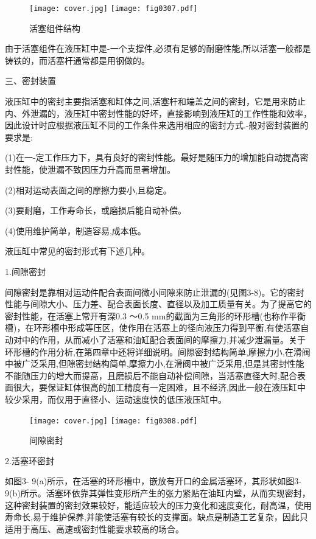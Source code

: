 \begin{figure}
\centering
\ifOpenSource
\texttt{[image: cover.jpg]}
\else
\texttt{[image: fig0307.pdf]}
\fi
\caption{活塞组件结构}
\label{fig:fig0307}
\end{figure}

\indent 由于活塞组件在液压缸中是-一个支撑件,必须有足够的耐磨性能,所以活塞一般都是铸铁的，而活塞杆通常都是用钢做的。

\indent 三、密封装置

\indent 液压缸中的密封主要指活塞和缸体之间,活塞杆和端盖之间的密封，它是用来防止内、外泄漏的，液压缸中密封性能的好坏，直接影响到液压缸的工作性能和效率，因此设计时应根据液压缸不同的工作条件来选用相应的密封方式.-般对密封装置的要求是:

\indent (1)在一-定工作压力下，具有良好的密封性能。最好是随压力的增加能自动提高密封性能，使泄漏不致因压力升高而显著增加。

\indent (2)相对运动表面之间的摩擦力要小,且稳定。

\indent (3)要耐磨，工作寿命长，或磨损后能自动补偿。

\indent (4)使用维护简单，制造容易,成本低。

\indent 液压缸中常见的密封形式有下述几种。

\indent 1.间隙密封

\indent 间隙密封是靠相对运动件配合表面间微小间隙来防止泄漏的(见图3-8)。它的密封性能与间隙大小、压力差、配合表面长度、直径以及加工质量有关。为了提高它的密封性能，在活塞上常开有深0.3 ～0.5 mm的截面为三角形的环形槽(也称作平衡槽)，在环形槽中形成等压区，使作用在活塞上的径向液压力得到平衡,有使活塞自动对中的作用，从而减小了活塞和油缸配合表面间的摩擦力,并减少泄漏量。关于环形槽的作用分析,在第四章中还将详细说明。间隙密封结构简单,摩擦力小,在滑阀中被广泛采用,但隙密封结构简单,摩擦力小,在滑阀中被广泛采用,但是其密封性能不能随压力的增大而提高，且磨损后不能自动补偿间隙，当活塞直径大时,配合表面很大，要保证缸体很高的加工精度有一定困难，且不经济,因此一般在液压缸中较少采用，而仅用于直径小、运动速度快的低压液压缸中。

\begin{figure}
\centering
\ifOpenSource
\texttt{[image: cover.jpg]}
\else
\texttt{[image: fig0308.pdf]}
\fi
\caption{间隙密封}
\label{fig:fig0308}
\end{figure}

\indent 2.活塞环密封

\indent 如图3- 9(a)所示，在活塞的环形槽中，嵌放有开口的金属活塞环，其形状如图3-9(b)所示。活塞环依靠其弹性变形所产生的张力紧贴在油缸内壁，从而实现密封，这种密封装置的密封效果较好，能适应较大的压力变化和速度变化，耐高温，使用寿命长,易于维护保养,并能使活塞有较长的支撑面。缺点是制造工艺复杂，因此只适用于高压、高速或密封性能要求较高的场合。

